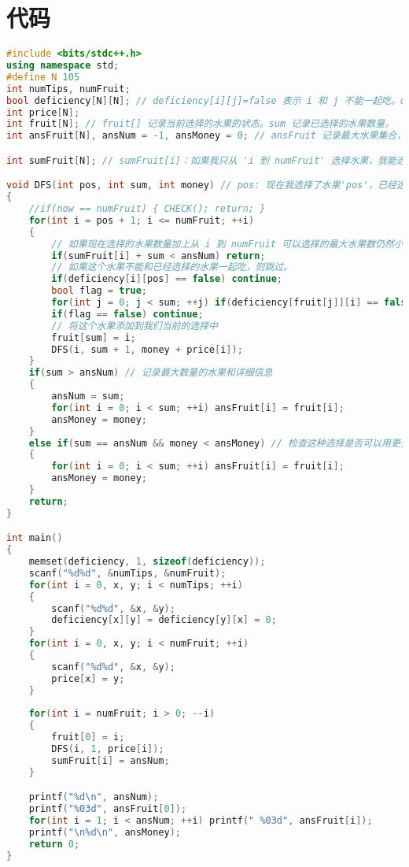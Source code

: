 \documentclass{ctexart} %
\begin{document}
\section*{代码}
\begin{lstlisting}[caption = main.cpp, language = c++]
#include <bits/stdc++.h>
using namespace std;
#define N 105
int numTips, numFruit;
bool deficiency[N][N]; // deficiency[i][j]=false 表示 i 和 j 不能一起吃。deficiency[i][j]=true 表示 i 和 j 可以一起吃。
int price[N];
int fruit[N]; // fruit[] 记录当前选择的水果的状态。sum 记录已选择的水果数量。
int ansFruit[N], ansNum = -1, ansMoney = 0; // ansFruit 记录最大水果集合，ansNum 记录最大数量的水果。ansMoney 记录最小金额。

int sumFruit[N]; // sumFruit[i]：如果我只从 'i 到 numFruit' 选择水果，我能选择的最大水果数。

void DFS(int pos, int sum, int money) // pos: 现在我选择了水果'pos'，已经选择了 'sum' 数量的水果。money：当前花费的总金额。
{
    //if(now == numFruit) { CHECK(); return; }
    for(int i = pos + 1; i <= numFruit; ++i)
    {
        // 如果现在选择的水果数量加上从 i 到 numFruit 可以选择的最大水果数仍然小于 ansNum，我们可以忽略剩余的情况。
        if(sumFruit[i] + sum < ansNum) return;
        // 如果这个水果不能和已经选择的水果一起吃，则跳过。
        if(deficiency[i][pos] == false) continue;
        bool flag = true;
        for(int j = 0; j < sum; ++j) if(deficiency[fruit[j]][i] == false) { flag = false; break; }
        if(flag == false) continue;
        // 将这个水果添加到我们当前的选择中
        fruit[sum] = i;
        DFS(i, sum + 1, money + price[i]);
    }
    if(sum > ansNum) // 记录最大数量的水果和详细信息
    {
        ansNum = sum;
        for(int i = 0; i < sum; ++i) ansFruit[i] = fruit[i];
        ansMoney = money;
    }
    else if(sum == ansNum && money < ansMoney) // 检查这种选择是否可以用更少的钱
    {
        for(int i = 0; i < sum; ++i) ansFruit[i] = fruit[i];
        ansMoney = money;
    }
    return;
}

int main()
{
    memset(deficiency, 1, sizeof(deficiency));
    scanf("%d%d", &numTips, &numFruit);
    for(int i = 0, x, y; i < numTips; ++i)
    {
        scanf("%d%d", &x, &y);
        deficiency[x][y] = deficiency[y][x] = 0;
    }
    for(int i = 0, x, y; i < numFruit; ++i)
    {
        scanf("%d%d", &x, &y);
        price[x] = y;
    }
    
    for(int i = numFruit; i > 0; --i)
    {
        fruit[0] = i;
        DFS(i, 1, price[i]);
        sumFruit[i] = ansNum;
    }

    printf("%d\n", ansNum);
    printf("%03d", ansFruit[0]);
    for(int i = 1; i < ansNum; ++i) printf(" %03d", ansFruit[i]);
    printf("\n%d\n", ansMoney);
    return 0;
}

\end{lstlisting}
\end{document}
